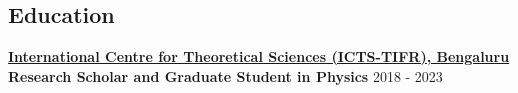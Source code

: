 \documentclass[11pt, margin, centered, letterpaper]{res}
\begin{document}
\begin{resume}
\begin{comment}
\section{Projects}
\begin{itemize}[leftmargin=*]
	\item \textbf{Aditya Vijaykumar}, MV Saketh, Sumit Kumar, Parameswaran Ajith, Tirthankar Roy Choudhury.\\
	\textit{Probing the cosmological large-scale structure using gravitational-wave observations} \\
	\textit{(manuscript under LIGO PnP review, to be submitted to arXiv soon)}
	\\
	\item \textbf{Aditya Vijaykumar}, Shasvath Kapadia, Parameswaran Ajith.\\
	\textit{Constraining the time-variation of the Gravitational constant using gravitational-wave observations of binary neutron stars} \\
	\textit{(manuscript under LIGO PnP review, to be submitted to arXiv soon)}
	\\
	\item \textbf{Aditya Vijaykumar}, Nathan Johnson-McDaniel, Rahul Kashyap, Arunava Mukherjee, Parameswaran Ajith.\\	
	\textit{Constraints on Black Hole Mimickers from the Gravitational-wave Transient Catalog (GWTC) -1 }
	\\
	\item Apratim Ganguly, \textbf{Aditya Vijaykumar}, Abhirup Ghosh, Parameswaran Ajith.\\	
	\textit{Probing General Relativity from the consistency of inspiral and merger-ringdown of Binary Black Holes}


\end{itemize}

\end{comment}

\section{Education}
\textbf{\href{https://www.icts.res.in/}{International Centre for Theoretical Sciences (ICTS-TIFR), Bengaluru}}\\
\textbf{Research Scholar and Graduate Student in Physics} \hfill 2018 - 2023


\end{resume}
\end{document}
